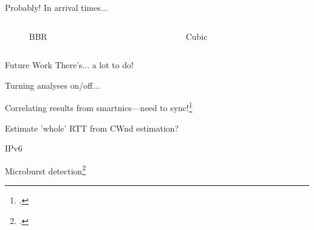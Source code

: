\documentclass[aspectratio=169,xcolor={dvipsnames}
,notes
,handout
]{beamer}
\begin{document}
\begin{frame}{Probably! In arrival times...}
	\begin{columns}
		\begin{column}{0.5\linewidth}
			\begin{figure}
				\caption{BBR}
			\end{figure}
		\end{column}
		\begin{column}{0.5\linewidth}
			\begin{figure}
				\caption{Cubic}
			\end{figure}
		\end{column}
	\end{columns}
\end{frame}

\begin{frame}{Future Work}
	There's... a lot to do!
	
	Turning analyses on/off...
	
	Correlating results from smartnics---need to sync!\footcite{DBLP:conf/sosr/KannanJC19}
	
	Estimate 'whole' RTT from CWnd estimation?
	
	IPv6
	
	Microburst detection\footcite{DBLP:conf/sigcomm/ChenFKRR18}
\end{frame}
\end{document}
